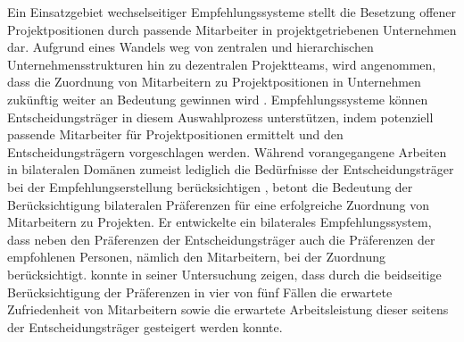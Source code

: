 Ein Einsatzgebiet wechselseitiger Empfehlungssysteme stellt die Besetzung offener Projektpositionen durch passende Mitarbeiter in projektgetriebenen Unternehmen dar.
Aufgrund eines Wandels weg von zentralen und hierarchischen Unternehmensstrukturen hin zu dezentralen Projektteams, wird angenommen, dass die Zuordnung von Mitarbeitern zu Projektpositionen in Unternehmen zukünftig weiter an Bedeutung gewinnen wird \cite[S. 2]{link:booklet}. %
Empfehlungssysteme können Entscheidungsträger in diesem Auswahlprozess unterstützen, indem potenziell passende Mitarbeiter für Projektpositionen ermittelt und den Entscheidungsträgern vorgeschlagen werden.
Während vorangegangene Arbeiten in bilateralen Domänen zumeist lediglich die Bedürfnisse der Entscheidungsträger bei der Empfehlungserstellung berücksichtigen \cite[S. 2f.]{siting:2012}, betont \textcite[S. 2]{link:booklet} die Bedeutung der Berücksichtigung bilateralen Präferenzen für eine erfolgreiche Zuordnung von Mitarbeitern zu Projekten.
Er entwickelte ein bilaterales Empfehlungssystem, dass neben den Präferenzen der Entscheidungsträger auch die Präferenzen der empfohlenen Personen, nämlich den Mitarbeitern, bei der Zuordnung berücksichtigt.
\textcite[S. 3]{link:booklet} konnte in seiner Untersuchung zeigen, dass durch die beidseitige Berücksichtigung der Präferenzen in vier von fünf Fällen die erwartete Zufriedenheit von Mitarbeitern sowie die erwartete Arbeitsleistung dieser seitens der Entscheidungsträger gesteigert werden konnte.

